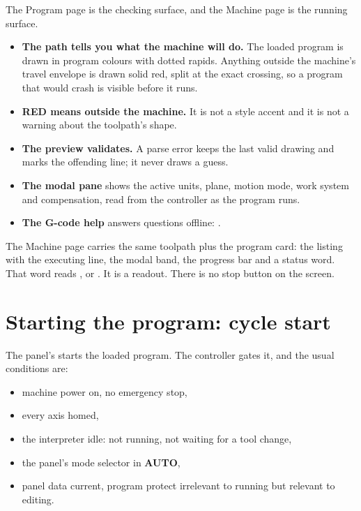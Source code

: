 The Program page is the checking surface, and the Machine page is the running surface.

\begin{itemize}
  \item \textbf{The path tells you what the machine will do.} The loaded program is drawn in
        program colours with dotted rapids. Anything outside the machine's travel envelope is
        drawn solid red, split at the exact crossing, so a program that would crash is
        visible before it runs.
  \item \textbf{RED means outside the machine.} It is not a style accent and it is not a
        warning about the toolpath's shape.
  \item \textbf{The preview validates.} A parse error keeps the last valid drawing and marks
        the offending line; it never draws a guess.
  \item \textbf{The modal pane} shows the active units, plane, motion mode, work system and
        compensation, read from the controller as the program runs.
  \item \textbf{The G-code help} answers questions offline: .
\end{itemize}

The Machine page carries the same toolpath plus the program card: the listing with the
executing line, the modal band, the progress bar and a status word. That word reads
,  or . It is a readout. There is no stop button on
the screen.

\section{Starting the program: cycle start}

The panel's  starts the loaded program. The controller gates it, and the
usual conditions are:

\begin{itemize}
  \item machine power on, no emergency stop,
  \item every axis homed,
  \item the interpreter idle: not running, not waiting for a tool change,
  \item the panel's mode selector in \textbf{AUTO},
  \item panel data current, program protect irrelevant to running but relevant to editing.
\end{itemize}

